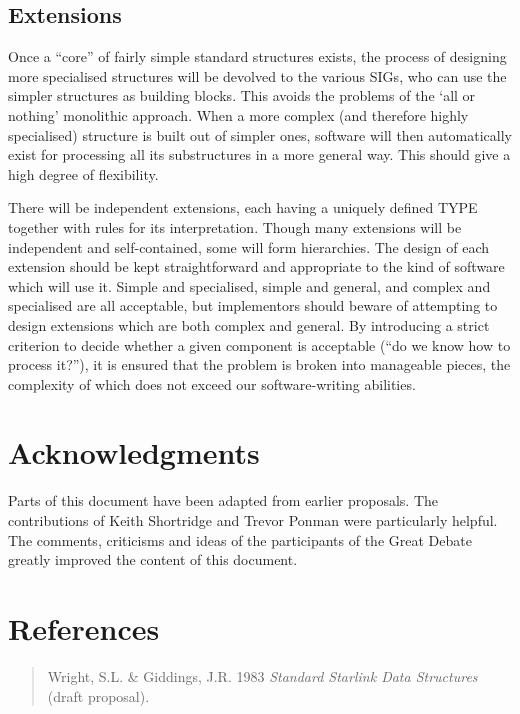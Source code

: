 \documentclass[twoside,11pt]{article}
\renewcommand{\_}{\texttt{\symbol{95}}}
\begin{document}
\subsection{Extensions}
Once a ``core'' of fairly simple standard structures exists, the
process of designing more specialised structures will be devolved to
the various SIGs, who can use the simpler structures as building
blocks.  This avoids the problems of the `all or nothing'
monolithic approach.  When a more complex (and therefore
highly specialised) structure is built out of simpler ones, software
will then automatically exist for processing all its substructures in
a more general way. This should give a high degree of flexibility.

There will be independent extensions, each
having a uniquely defined TYPE together with rules for its
interpretation.
Though many extensions will be independent and self-contained,
some will form hierarchies.
The design of each extension should be kept straightforward
and appropriate to the kind of software which will use it.
Simple and specialised,
simple and general, and
complex and specialised are all acceptable,
but implementors should beware of attempting to
design extensions which are both complex and general.  By
introducing a strict criterion to decide whether a given component is
acceptable (``do we know how to process it?''), it is ensured that the
problem is broken into manageable
pieces, the complexity of which does not exceed our software-writing
abilities.

\section{Acknowledgments}
\label{se:acknow}

Parts of this document have been adapted from earlier proposals. The
contributions of Keith Shortridge and Trevor Ponman
were particularly helpful.  The comments, criticisms and ideas of the
participants of the Great Debate greatly improved the
content of this document.

\section{References}
\label{se:refs}

\parindent=-3mm
\begin{verse}
\hspace{-9.2mm}
Wright, S.L. \& Giddings, J.R.  1983 {\it Standard Starlink Data
Structures} (draft proposal).
\vspace{-2mm}
\end{verse}
\end{document}
